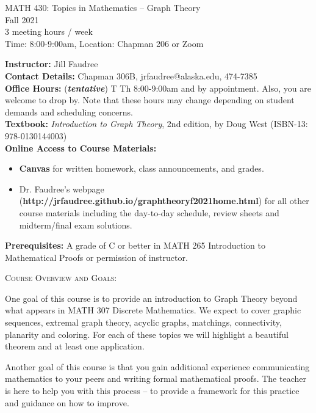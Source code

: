 \documentclass[11pt]{article}
\begin{document}
\begin{center}MATH 430: Topics in Mathematics -- Graph Theory  \\ Fall 2021 \\ 3 meeting hours / week  \\ Time: 8:00-9:00am, Location: Chapman 206 or Zoom
\end{center}

\hrulefill

\textbf{Instructor:} Jill Faudree\\
\textbf{Contact Details:} Chapman 306B, jrfaudree@alaska.edu, 474-7385\\
\textbf{Office Hours:} (\textbf{\emph{tentative}})  T Th 8:00-9:00am and by appointment. Also, you are welcome to drop by. Note that these hours may change depending on student demands and scheduling concerns.\\
\textbf{Textbook:} \emph{Introduction to Graph Theory}, 2nd edition, by Doug West (ISBN-13: 978-0130144003)\\
\textbf{Online Access to Course Materials:} 
\begin{itemize}
	\item \textbf{Canvas} for written homework, class announcements, and grades.
	\item Dr. Faudree's webpage (\textbf{http://jrfaudree.github.io/graphtheoryf2021home.html}) for all other course materials including the day-to-day schedule, review sheets and midterm/final exam solutions. 
	\end{itemize}
\textbf{Prerequisites:} A grade of C or better in MATH 265 Introduction to Mathematical Proofs or permission of instructor.\\

\hrulefill

{\textsc{Course Overview and Goals:}}

One goal of this course is to provide an introduction to Graph Theory beyond what appears in MATH 307 Discrete Mathematics.  We expect to cover graphic sequences, extremal graph theory, acyclic graphs, matchings, connectivity, planarity and coloring. For each of these topics we will highlight a beautiful theorem and at least one application. 

Another goal of this course is that you gain additional experience communicating mathematics
to your peers and writing formal mathematical proofs.
The teacher is here to help you with this process -- to provide a framework for this practice and guidance on how to improve. 
\end{document}
